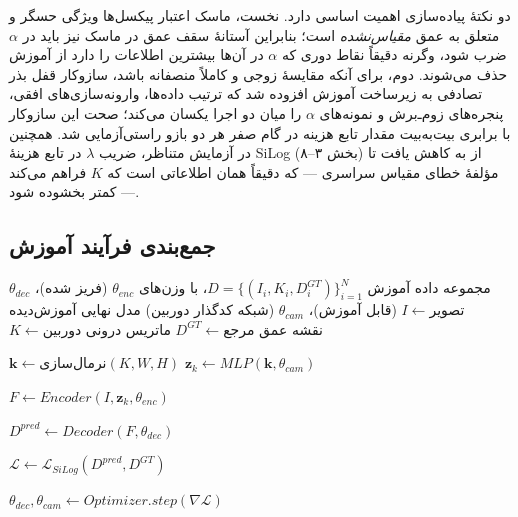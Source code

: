 دو نکتهٔ پیاده‌سازی اهمیت اساسی دارد. نخست، ماسک اعتبار پیکسل‌ها ویژگی حسگر و متعلق به عمق \emph{مقیاس‌نشده} است؛ بنابراین آستانهٔ سقف عمق در ماسک نیز باید در $\alpha$ ضرب شود، وگرنه دقیقاً نقاط دوری که $\alpha$ در آن‌ها بیشترین اطلاعات را دارد از آموزش حذف می‌شوند. دوم، برای آنکه مقایسهٔ زوجی \proposedmodel{} و \controlmodel{} کاملاً منصفانه باشد، سازوکار قفل بذر تصادفی به زیرساخت آموزش افزوده شد که ترتیب داده‌ها، وارونه‌سازی‌های افقی، پنجره‌های زوم‌ـ‌برش و نمونه‌های $\alpha$ را میان دو اجرا یکسان می‌کند؛ صحت این سازوکار با برابری بیت‌به‌بیت مقدار تابع هزینه در گام صفر هر دو بازو راستی‌آزمایی شد. همچنین در آزمایش متناظر، ضریب $\lambda$ در تابع هزینهٔ SiLog (بخش ۳--۸) از  به  کاهش یافت تا مؤلفهٔ خطای مقیاس سراسری --- که دقیقاً همان اطلاعاتی است که $K$ فراهم می‌کند --- کمتر بخشوده شود.

\subsection{جمع‌بندی فرآیند آموزش}

\begin{algorithm}[htbp]
\caption{روند آموزش مدل با پارامترهای هندسی}
\label{alg:training_pipeline}
\begin{algorithmic}[1]
\REQUIRE مجموعه داده آموزش $D = \{(I_i, K_i, D^{GT}_i)\}_{i=1}^N$، \basemodel{} با وزن‌های $\theta_{enc}$ (فریز شده)، $\theta_{dec}$ (قابل آموزش)، $\theta_{cam}$ (شبکه کدگذار دوربین)
\ENSURE مدل نهایی آموزش‌دیده
        \STATE $I \gets \text{تصویر}$
        \STATE $K \gets \text{ماتریس درونی دوربین}$
        \STATE $D^{GT} \gets \text{نقشه عمق مرجع}$
        
        \STATE {}
        \STATE $\mathbf{k} \gets \text{نرمال‌سازی}(K, W, H)$
        \STATE $\mathbf{z}_k \gets MLP(\mathbf{k}, \theta_{cam})$

        \STATE {}
        \STATE $F \gets Encoder(I, \mathbf{z}_k, \theta_{enc})$

        \STATE {}
        \STATE $D^{pred} \gets Decoder(F, \theta_{dec})$
        
        \STATE {}
        \STATE $\mathcal{L} \gets \mathcal{L}_{SiLog}(D^{pred}, D^{GT})$
        
        \STATE {}
        \STATE $\theta_{dec}, \theta_{cam} \gets Optimizer.step(\nabla \mathcal{L})$
    \ENDFOR
\ENDFOR
\end{algorithmic}
\end{algorithm}

